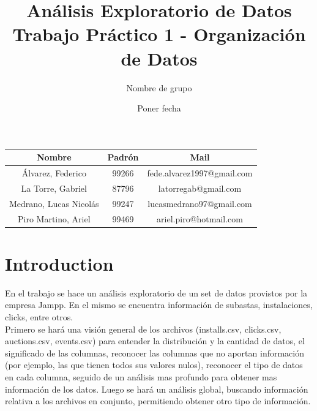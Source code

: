 \documentclass[a4paper, 12pt]{article}
\title{Análisis Exploratorio de Datos \\ Trabajo Práctico 1 - Organización de Datos}
\author{Nombre de grupo}
\date{Poner fecha}
\newcommand\tab[1][1cm]{\hspace*{#1}}
\begin{document}
\begin{figure}
    \centering
\end{figure}

\maketitle

\FloatBarrier
\begin{center}
        \begin{tabular}{ |c|c|c| }
          \hline
          Nombre & Padrón & Mail \\
          \hline\hline
          Álvarez, Federico & 99266 & fede.alvarez1997@gmail.com \\
          \hline
          La Torre, Gabriel & 87796 & latorregab@gmail.com \\
          \hline
          Medrano, Lucas Nicolás & 99247 & lucasmedrano97@gmail.com \\
          \hline
          Piro Martino, Ariel & 99469 & ariel.piro@hotmail.com \\
          \hline
        \end{tabular}
\end{center}
\FloatBarrier

\newpage

\tableofcontents
\newpage
\section{Introduction}
	\tab En el trabajo se hace un análisis exploratorio de un set de datos provistos por la empresa Jampp. En el mismo se encuentra información de subastas, instalaciones, clicks, entre otros.\\
	\tab Primero se hará una visión general de los archivos (installs.csv, clicks.csv, auctions.csv, events.csv) para entender la distribución y la cantidad de datos, el significado de las columnas, reconocer las columnas que no aportan información (por ejemplo, las que tienen todos sus valores nulos), reconocer el tipo de datos en cada columna, seguido de un análisis mas profundo para obtener mas información de los datos. Luego se hará un análisis global, buscando información relativa a los archivos en conjunto, permitiendo obtener otro tipo de información.
\end{document}

